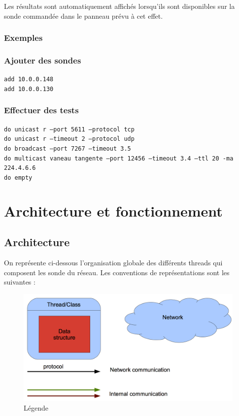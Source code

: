 \documentclass[a4paper,11pt]{article}
\begin{document}
Les résultats sont automatiquement affichés lorsqu'ils sont disponibles sur la sonde commandée dans le panneau prévu à cet effet.


\subsubsection{Exemples}
\subsubsection*{Ajouter des sondes}
\texttt{add 10.0.0.148}\\
\indent\texttt{add 10.0.0.130}

\subsubsection*{Effectuer des tests}
\texttt{do unicast r --port 5611 --protocol tcp}\\
\indent\texttt{do unicast r --timeout 2 --protocol udp}\\
\indent\texttt{do broadcast --port 7267 --timeout 3.5 }\\
\indent\texttt{do multicast vaneau tangente --port 12456 --timeout 3.4 --ttl 20 -ma 224.4.6.6}\\
\indent\texttt{do empty}

\section{Architecture et fonctionnement}


\subsection{Architecture}

On représente ci-dessous l'organisation globale des différents threads qui composent les sonde du réseau.
Les conventions de représentations sont les suivantes :
\begin{figure}[!ht]
\centering\includegraphics[width=\linewidth]{img/graphLegend.png}
\caption{Légende}
\end{figure}
\end{document}
